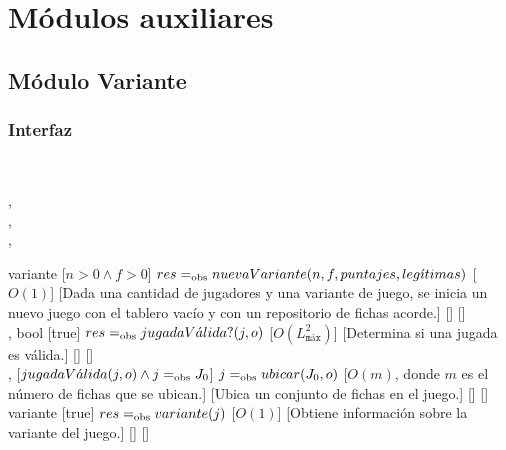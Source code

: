 \section{Módulos auxiliares}
\subsection{Módulo Variante}
\begin{interfaz}{\subsubsection{Interfaz}}
  \\
  \usa{\falta}
  \par\noindent
  \begin{operaciones}
    {
      \begin{adjustwidth}{2em}{}
      ,\\
      ,\\
      ,\\
      \end{adjustwidth}
    }{variante}
    [$n>0\land f>0$]
    {$res =_{\mathrm{obs}} nuevaVariante(n,f,puntajes,leg\acute{\imath}timas)$}
    [$O(1)$]
    [Dada una cantidad de jugadores y una variante de juego, se inicia un nuevo juego con el tablero vacío y con un repositorio de fichas acorde.]
    [\falta]
    [\falta]\\

    \noindent{}
    {
      ,
    }{bool}
    [true]
    {$res=_{\mathrm{obs}} jugadaV\acute{a}lida?(j,o)$}
    [$O(L_{\texttt{máx}}^{2})$]
    [Determina si una jugada es válida.]
    [\falta]
    [\falta]\\

    \noindent{}
    {
      ,
    }{}
    [$jugadaV\acute{a}lida(j,o) \land j=_{\mathrm{obs}} J_{0} $]
    {$j=_{\mathrm{obs}} ubicar(J_{0},o)$}
    [$O(m)$, donde $m$ es el número de fichas que se ubican.]
    [Ubica un conjunto de fichas en el juego.]
    [\falta]
    [\falta]\\

    \noindent{}
    {
    }{variante}
    [true]
    {$res=_{\mathrm{obs}} variante(j)$}
    [$O(1)$]
    [Obtiene información sobre la variante del juego.]
    [\falta]
    [\falta]\\


\end{operaciones}
\end{interfaz}
